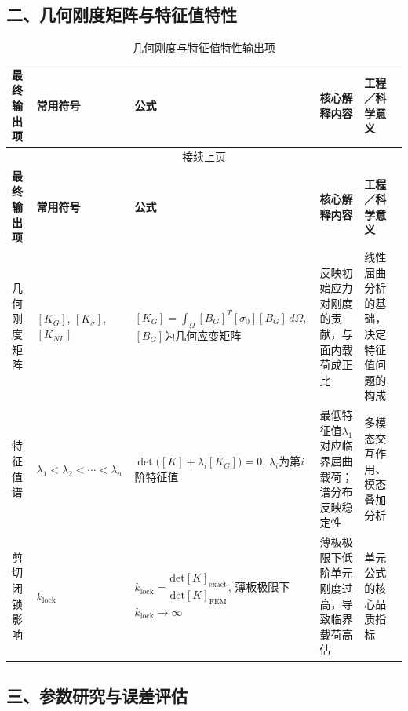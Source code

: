 \documentclass[12pt,a4paper]{article}
\begin{document}
\begin{landscape}
\subsection*{二、几何刚度矩阵与特征值特性}

\begin{longtable}{p{2.4cm}p{2.4cm}p{5.5cm}p{4.5cm}p{4.5cm}}
\caption{几何刚度与特征值特性输出项} \label{tab:geom_stiff} \\
\toprule
\textbf{最终输出项} & \textbf{常用符号} & \textbf{公式} & \textbf{核心解释内容} & \textbf{工程／科学意义} \\
\midrule
\endfirsthead
\multicolumn{5}{c}{接续上页} \\
\toprule
\textbf{最终输出项} & \textbf{常用符号} & \textbf{公式} & \textbf{核心解释内容} & \textbf{工程／科学意义} \\
\midrule
\endhead
\bottomrule
\endfoot
几何刚度矩阵 & $[K_G]$, $[K_\sigma]$, $[K_{NL}]$ & $[K_G]=\int_\Omega [B_G]^T[\sigma_0][B_G]\,d\Omega$, $[B_G]$为几何应变矩阵 & 反映初始应力对刚度的贡献，与面内载荷成正比 & 线性屈曲分析的基础，决定特征值问题的构成 \\
\addlinespace
特征值谱 & $\lambda_1<\lambda_2<\cdots<\lambda_n$ & $\det\bigl([K]+\lambda_i[K_G]\bigr)=0$, $\lambda_i$为第$i$阶特征值 & 最低特征值$\lambda_1$对应临界屈曲载荷；谱分布反映稳定性 & 多模态交互作用、模态叠加分析 \\
\addlinespace
剪切闭锁影响 & $k_{\text{lock}}$ & $k_{\text{lock}}=\dfrac{\text{det}[K]_{\text{exact}}}{\text{det}[K]_{\text{FEM}}}$, 薄板极限下$k_{\text{lock}}\to\infty$ & 薄板极限下低阶单元刚度过高，导致临界载荷高估 & 单元公式的核心品质指标 \\
\end{longtable}

\subsection*{三、参数研究与误差评估}


\end{landscape}
\end{document}
